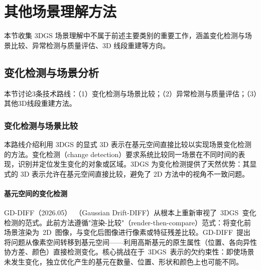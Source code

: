 

\section{其他场景理解方法}
\label{sec:10_7}

本节收集 3DGS 场景理解中不属于前述主要类别的重要工作，涵盖变化检测与场景比较、异常检测与质量评估、3D 线段重建等方向。

\subsection{变化检测与场景分析}
\label{ss:10_5}

本节讨论3条技术路线：（1）变化检测与场景比较；（2）异常检测与质量评估；（3）其他3D线段重建方法。

\subsubsection{变化检测与场景比较}

本路线介绍利用 3DGS 的显式 3D 表示在基元空间直接比较以实现场景变化检测的方法。变化检测（change detection）要求系统比较同一场景在不同时间的表现，识别并定位发生变化的对象或区域。3DGS 为变化检测提供了天然优势：其显式的 3D 表示允许在基元空间直接比较，避免了 2D 方法中的视角不一致问题。

\paragraph{基元空间的变化检测}

GD-DIFF（2026.05）~\cite{2605_07203}（Gaussian Drift-DIFF）从根本上重新审视了~3DGS~变化检测的范式。此前方法遵循"渲染-比较"（render-then-compare）范式：将变化前场景渲染为~2D~图像，与变化后图像进行像素或特征残差比较。GD-DIFF~提出将问题从像素空间转移到基元空间——利用高斯基元的原生属性（位置、各向异性协方差、颜色）直接检测变化。核心挑战在于~3DGS~表示的欠约束性：即使场景未发生变化，独立优化产生的基元在数量、位置、形状和颜色上也可能不同。


